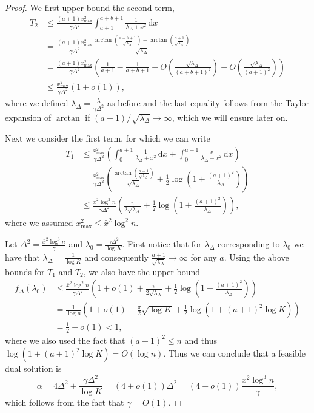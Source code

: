\documentclass{article}
\def \dx{\, \mathrm{d}}
\begin{document}
\begin{proof}
  We first upper bound the second term,
  \begin{align*}
    T_2 &\leq \frac{(a+1) x_{\max}^2}{\gamma \Delta^2} \int_{a+1}^{a+b+1} \frac{1}{\lambda_\Delta + x^2} \dx x \\
    & = \frac{(a+1) x_{\max}^2}{\gamma \Delta^2} \frac{\arctan\left(\frac{a+b+1}{\sqrt{\lambda_\Delta}}\right) - \arctan\left(\frac{a+1}{\sqrt{\lambda_\Delta}}\right)}{\sqrt{\lambda_\Delta}} \\
    & = \frac{(a+1) x_{\max}^2}{\gamma \Delta^2} \left( \frac{1}{a+1} - \frac{1}{a+b+1}+ O\left(\frac{\sqrt{\lambda_\Delta}}{(a+b+1)^2}\right) - O\left(\frac{\sqrt{\lambda_\Delta}}{(a+1)^2}\right) \right) \\
    & \leq \frac{x_{\max}^2}{\gamma \Delta^2} (1 + o(1)),
  \end{align*}
  where we defined $\lambda_\Delta = \frac{\lambda}{\gamma \Delta^2}$ as before and the last equality follows from the Taylor expansion of $\arctan$ if $(a+1)/\sqrt{\lambda_\Delta} \to \infty$, which we will ensure later on.

  Next we consider the first term, for which we can write
  \begin{align*}
    T_1 & \leq \frac{x_{\max}^2}{\gamma \Delta^2} \left( \int_0^{a+1} \frac{1}{\lambda_\Delta + x^2} \dx x + \int_0^{a+1} \frac{x}{\lambda_\Delta + x^2} \dx x \right) \\
    & = \frac{x_{\max}^2}{\gamma \Delta^2} \left( \frac{\arctan\left(\frac{a+1}{\sqrt{\lambda_\Delta}} \right)}{\sqrt{\lambda_\Delta}} + \frac{1}{2} \log \left( 1 + \frac{(a+1)^2}{\lambda_\Delta} \right) \right) \\
    & \leq \frac{\bar{x}^2 \log^2 n}{\gamma \Delta^2} \left( \frac{\pi}{2 \sqrt{\lambda_\Delta}} + \frac{1}{2} \log \left( 1 + \frac{(a+1)^2}{\lambda_\Delta} \right) \right),
  \end{align*}
  where we assumed $x_{\max}^2 \leq \bar{x}^2 \log^2 n$.

  Let $\Delta^2 = \frac{\bar{x}^2 \log^3 n}{\gamma}$ and $\lambda_0 = \frac{\gamma \Delta^2}{\log K}$. First notice that for $\lambda_\Delta$ corresponding to $\lambda_0$ we have that $\lambda_\Delta = \frac{1}{\log K}$ and consequently $\frac{a+1}{\sqrt{\lambda_\Delta}} \to \infty$ for any $a$. Using the above bounds for $T_1$ and $T_2$, we also have the upper bound
  \begin{align*}
    f_\Delta(\lambda_0) & \leq \frac{\bar{x}^2 \log^2 n}{\gamma \Delta^2} \left( 1 + o(1) + \frac{\pi}{2 \sqrt{\lambda_\Delta}} + \frac{1}{2} \log \left( 1 + \frac{(a+1)^2}{\lambda_\Delta} \right) \right) \\
    & = \frac{1}{\log n} \left( 1 + o(1) + \frac{\pi}{2} \sqrt{\log K} + \frac{1}{2} \log \left( 1 + (a+1)^2 \log K \right) \right) \\
    & = \frac{1}{2} + o(1) < 1,
  \end{align*}
  where we also used the fact that $(a+1)^2 \leq n$ and thus $\log(1 + (a+1)^2 \log K) = O(\log n)$. Thus we can conclude that a feasible dual solution is
  \[ \alpha = 4 \Delta^2 + \frac{\gamma \Delta^2}{\log K} = (4 + o(1)) \Delta^2 = (4 + o(1)) \frac{\bar{x}^2 \log^3 n}{\gamma}, \]
  which follows from the fact that $\gamma = O(1)$.


\end{proof}
\end{document}
